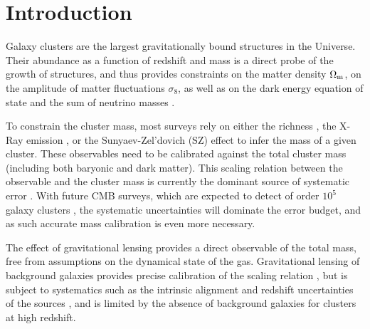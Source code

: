 \documentclass[prd, superscriptaddress, tightenlines, longbibliography, nofootinbib, eqsecnum, amsfonts, amsmath, floatfix, twocolumn, notitlepage]{revtex4-2}
\begin{document}
   \maketitle

\section{Introduction}
\setcounter{footnote}{0}

Galaxy clusters are the largest gravitationally bound structures in the Universe. Their abundance as a function of redshift and mass is a direct probe of the growth of structures, and thus provides constraints on the matter density $\Omega_{\rm m}$, on the amplitude of matter fluctuations $\sigma_8$, as well as on the dark energy equation of state and the sum of neutrino masses \cite{Vikhlinin:2008ym,Sehgal:2010ca,Allen:2011zs,Planck:2013lkt, Mantz:2014xba,Mantz:2014paa, Planck:2015lwi,SPT:2016izt, SPT:2018njh, SPT:2021efh, Raghunathan:2021zfi}. 

To constrain the cluster mass, most surveys rely on either the richness \cite[e.g.][]{Koester:2007bj,DES:2015mqu,Andreon:2016eck, Farahi:2016xux,Simet:2016mzg}, the X-Ray emission \cite[e.g.][]{Arnaud:2005ur, Arnaud:2007br, Vikhlinin:2008ym}, or the Sunyaev-Zel'dovich (SZ) effect \cite[e.g.][]{Vanderlinde:2010eb, Planck:2013lkt,Planck:2015lwi} to infer the mass of a given cluster. These observables need to be calibrated against the total cluster mass (including both baryonic and dark matter).
This scaling relation between the observable and the cluster mass is currently the dominant source of systematic error \cite{Pratt:2019cnf, Salvati:2020exw, Salvati:2021gkt}.
With future CMB surveys, which are expected to detect of order $10^5$ galaxy clusters \cite{Madhavacheril:2017onh, SimonsObservatory:2018koc, CMB-S4:2016ple, Raghunathan:2021zfi}, the systematic uncertainties will dominate the error budget, and as such accurate mass calibration is even more necessary.

The effect of gravitational lensing provides a direct observable of the total mass, free from assumptions on the dynamical state of the gas.
Gravitational lensing of background galaxies provides precise calibration of the scaling relation \cite{vonderLinden:2014haa, Hoekstra:2015gda, Smith:2015qhs, Sereno:2017zcn, Penna-Lima:2016tvo, Bellagamba:2018gec,Miyatake:2018lpb, Umetsu:2020wlf}, but is subject to systematics such as the intrinsic alignment and redshift uncertainties of the sources \cite{Becker:2010xj}, and is limited by the absence of background galaxies for clusters at high redshift.
\end{document}
